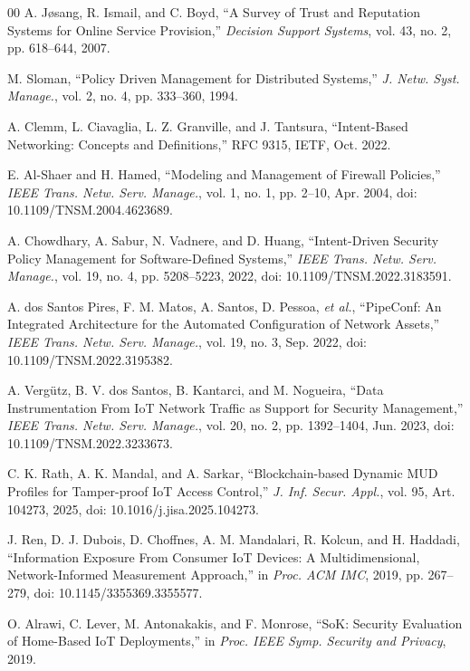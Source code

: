 \documentclass[journal]{IEEEtran}
\theoremstyle{definition}
\begin{document}
\begin{thebibliography}{00}
 A. J\o{}sang, R. Ismail, and C. Boyd, ``A Survey of Trust and
Reputation Systems for Online Service Provision,'' \emph{Decision Support Systems}, vol.
43, no. 2, pp. 618--644, 2007.

 M. Sloman, ``Policy Driven Management for Distributed Systems,'' \emph{J.
Netw. Syst. Manage.}, vol. 2, no. 4, pp. 333--360, 1994.

 A. Clemm, L. Ciavaglia, L. Z. Granville, and J. Tantsura,
``Intent-Based Networking: Concepts and Definitions,'' RFC 9315, IETF, Oct. 2022.

 E. Al-Shaer and H. Hamed, ``Modeling and Management of
Firewall Policies,'' \emph{IEEE Trans. Netw. Serv. Manage.}, vol. 1, no. 1, pp. 2--10,
Apr. 2004, doi: 10.1109/TNSM.2004.4623689.

 A. Chowdhary, A. Sabur, N. Vadnere, and D. Huang,
``Intent-Driven Security Policy Management for Software-Defined Systems,''
\emph{IEEE Trans. Netw. Serv. Manage.}, vol. 19, no. 4, pp. 5208--5223, 2022,
doi: 10.1109/TNSM.2022.3183591.

 A. dos Santos Pires, F. M. Matos, A. Santos, D. Pessoa,
\emph{et al.}, ``PipeConf: An Integrated Architecture for the Automated
Configuration of Network Assets,'' \emph{IEEE Trans. Netw. Serv. Manage.},
vol. 19, no. 3, Sep. 2022, doi: 10.1109/TNSM.2022.3195382.

 A. Verg\"utz, B. V. dos Santos, B. Kantarci, and
M. Nogueira, ``Data Instrumentation From IoT Network Traffic as Support for
Security Management,'' \emph{IEEE Trans. Netw. Serv. Manage.}, vol. 20, no. 2,
pp. 1392--1404, Jun. 2023, doi: 10.1109/TNSM.2022.3233673.

 C. K. Rath, A. K. Mandal, and A. Sarkar, ``Blockchain-based
Dynamic MUD Profiles for Tamper-proof IoT Access Control,'' \emph{J. Inf. Secur. Appl.},
vol. 95, Art. 104273, 2025, doi: 10.1016/j.jisa.2025.104273.

 J. Ren, D. J. Dubois, D. Choffnes, A. M. Mandalari, R. Kolcun, and
H. Haddadi, ``Information Exposure From Consumer IoT Devices: A Multidimensional,
Network-Informed Measurement Approach,'' in \emph{Proc. ACM IMC}, 2019,
pp. 267--279, doi: 10.1145/3355369.3355577.

 O. Alrawi, C. Lever, M. Antonakakis, and F. Monrose,
``SoK: Security Evaluation of Home-Based IoT Deployments,'' in \emph{Proc. IEEE
Symp. Security and Privacy}, 2019.


\end{thebibliography}
\end{document}
